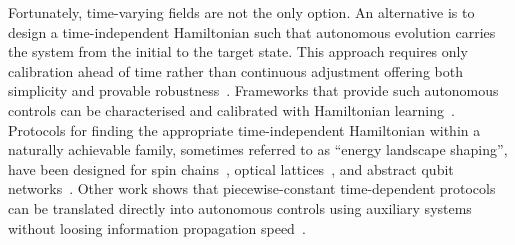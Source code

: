 \documentclass[aps,prx,reprint,superscriptaddress,footnote, twocolumn,notitlepage]{revtex4-2}
\begin{document}

Fortunately, time-varying fields are not the only option. An alternative is to design a time-independent Hamiltonian such that autonomous evolution carries the system from the initial to the target state. This approach requires only calibration ahead of time rather than continuous adjustment offering both simplicity and provable robustness~\cite{schirmer_design_2018, weidner_energy_2025}. Frameworks that provide such autonomous controls can be characterised and calibrated with Hamiltonian learning~\cite{kraft_bounded_2025}. Protocols for finding the appropriate time-independent Hamiltonian within a naturally achievable family, sometimes referred to as ``energy landscape shaping'', have been designed for spin chains~\cite{schirmer_design_2018}, optical lattices~\cite{weidner_energy_2025}, and abstract qubit networks~\cite{cieslinski_fastest_2023}. Other work shows that piecewise-constant time-dependent protocols can be translated directly into autonomous controls using auxiliary systems~\cite{mooney_time_2025I} without loosing information propagation speed~\cite{mooney_time_2025II}.
\end{document}
